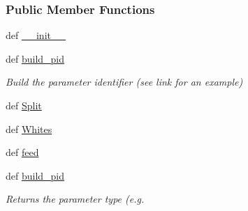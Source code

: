 \subsubsection*{Public Member Functions}
\begin{DoxyCompactItemize}
\item 
def \hyperlink{classforcebalance_1_1openmmio_1_1OpenMM__Reader_a111f672a2f7b835da774dc5e6f265731}{\-\_\-\-\_\-init\-\_\-\-\_\-}
\item 
def \hyperlink{classforcebalance_1_1openmmio_1_1OpenMM__Reader_ac89322d09d53425b5151f39306f4b38b}{build\-\_\-pid}
\begin{DoxyCompactList}\small\item\em Build the parameter identifier (see {\itshape link} for an example) \end{DoxyCompactList}\item 
def \hyperlink{classforcebalance_1_1BaseReader_acded199bbc003eb93d071a972ef38901}{Split}
\item 
def \hyperlink{classforcebalance_1_1BaseReader_af2af8a559625614474a1c6fe245b5e13}{Whites}
\item 
def \hyperlink{classforcebalance_1_1BaseReader_a3c46942ef8cc25ece21d52be5b7ba05f}{feed}
\item 
def \hyperlink{classforcebalance_1_1BaseReader_aab2c64ccf0f803d4eff3bbf40a6cb0b7}{build\-\_\-pid}
\begin{DoxyCompactList}\small\item\em Returns the parameter type (e.\-g. \end{DoxyCompactList}\end{DoxyCompactItemize}
